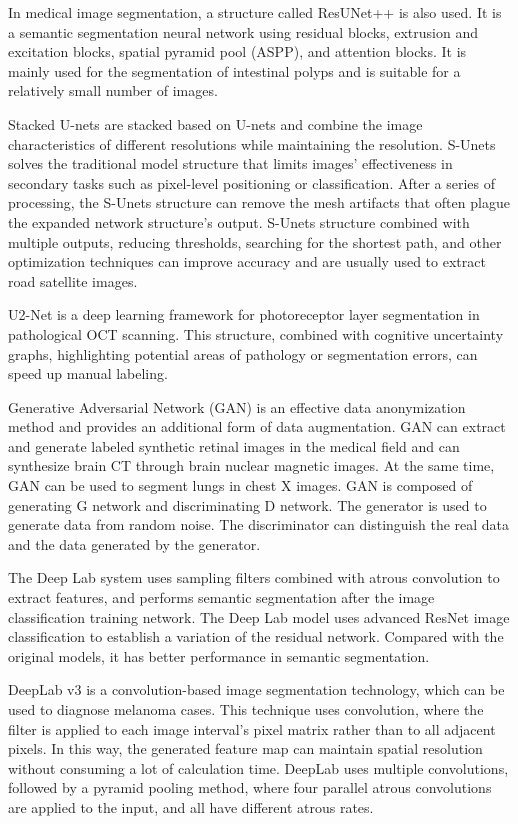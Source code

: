 \documentclass{article}
\begin{document}
In medical image segmentation, a structure called ResUNet++ is also used.
It is a semantic segmentation neural network using residual blocks, extrusion and excitation blocks, spatial pyramid pool (ASPP), and attention blocks.
It is mainly used for the segmentation of intestinal polyps and is suitable for a relatively small number of images.\cite{jha2019resunet++}

Stacked U-nets are stacked based on U-nets and combine the image characteristics of different resolutions while maintaining the resolution.
S-Unets solves the traditional model structure that limits images' effectiveness in secondary tasks such as pixel-level positioning or classification.\cite{shah2018stacked}
After a series of processing, the S-Unets structure can remove the mesh artifacts that often plague the expanded network structure's output.\cite{ghosh2018stacked}
S-Unets structure combined with multiple outputs, reducing thresholds, searching for the shortest path, and other optimization techniques can improve accuracy and are usually used to extract road satellite images.\cite{sun2018stacked}

U2-Net is a deep learning framework for photoreceptor layer segmentation in pathological OCT scanning.
This structure, combined with cognitive uncertainty graphs, highlighting potential areas of pathology or segmentation errors, can speed up manual labeling.\cite{orlando2019u2}

Generative Adversarial Network (GAN) is an effective data anonymization method and provides an additional form of data augmentation.
GAN can extract and generate labeled synthetic retinal images in the medical field and can synthesize brain CT through brain nuclear magnetic images.\cite{shin2018medical}
At the same time, GAN can be used to segment lungs in chest X images.
GAN is composed of generating G network and discriminating D network.
The generator is used to generate data from random noise.
The discriminator can distinguish the real data and the data generated by the generator.\cite{munawar2020segmentation}

The Deep Lab system uses sampling filters combined with atrous convolution to extract features, and performs semantic segmentation after the image classification training network.
The Deep Lab model uses advanced ResNet image classification to establish a variation of the residual network.
Compared with the original models, it has better performance in semantic segmentation.\cite{chen2017deeplab}

DeepLab v3 is a convolution-based image segmentation technology, which can be used to diagnose melanoma cases.
This technique uses convolution, where the filter is applied to each image interval's pixel matrix rather than to all adjacent pixels.
In this way, the generated feature map can maintain spatial resolution without consuming a lot of calculation time.
DeepLab uses multiple convolutions, followed by a pyramid pooling method, where four parallel atrous convolutions are applied to the input, and all have different atrous rates.\cite{wang2018skin}
\end{document}
